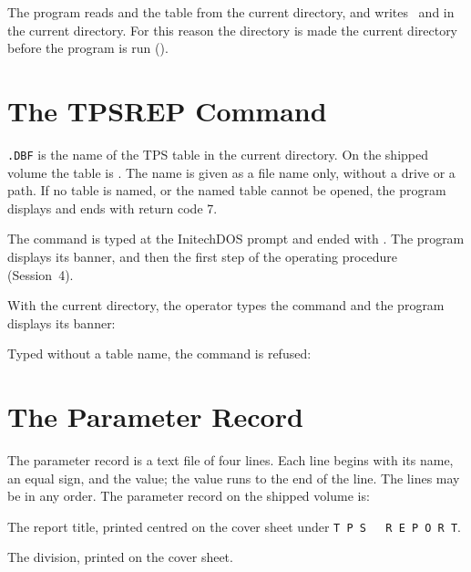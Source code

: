 The program reads  and the table from the current
directory, and writes \rpt\ and  in the current directory.
For this reason the directory  is made the current directory
before the program is run ().

\section{The TPSREP Command}
%

\texttt{.DBF} is the name of the TPS table in
the current directory.  On the shipped volume the table is .
The name is given as a file name only, without a drive or a path.  If no
table is named, or the named table cannot be opened, the program displays
 and ends with return code 7.

The command is typed at the InitechDOS prompt and ended with .
The program displays its banner, and then the first step of the operating
procedure (Session~4).

With  the current directory, the
operator types the command and the program displays its banner:


Typed without a table name, the command is refused:


\section{The Parameter Record}
The parameter record  is a text file of four lines.
Each line begins with its name, an equal sign, and the value; the value
runs to the end of the line.  The lines may be in any order.  The
parameter record on the shipped volume is:


The report title, printed centred on the cover sheet
under \texttt{T P S\ \ \ R E P O R T}.

The division, printed on the cover sheet.

